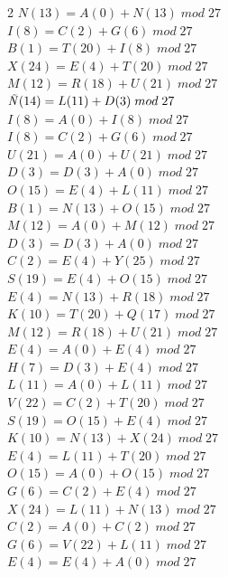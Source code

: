 \documentclass{article}
\begin{document}
\begin{enumerate}
\begin{multicols}{2}
$N (13) = A (0) + N (13) \; mod \; 27$ \\
$I (8) = C (2) + G (6) \; mod \; 27$ \\
$B (1) = T (20) + I (8) \; mod \; 27$ \\
$X (24) = E (4) + T (20) \; mod \; 27$ \\
$M (12) = R (18) + U (21) \; mod \; 27$ \\
$\text{\textit{Ñ}} (14) = L (11) + D (3) \; mod \; 27$ \\
$I (8) = A (0) + I (8) \; mod \; 27$ \\
$I (8) = C (2) + G (6) \; mod \; 27$ \\
$U (21) = A (0) + U (21) \; mod \; 27$ \\
$D (3) = D (3) + A (0) \; mod \; 27$ \\
$O (15) = E (4) + L (11) \; mod \; 27$ \\
$B (1) = N (13) + O (15) \; mod \; 27$ \\
$M (12) = A (0) + M (12) \; mod \; 27$ \\
$D (3) = D (3) + A (0) \; mod \; 27$ \\
$C (2) = E (4) + Y (25) \; mod \; 27$ \\
$S (19) = E (4) + O (15) \; mod \; 27$ \\
$E (4) = N (13) + R (18) \; mod \; 27$ \\
$K (10) = T (20) + Q (17) \; mod \; 27$ \\
$M (12) = R (18) + U (21) \; mod \; 27$ \\
$E (4) = A (0) + E (4) \; mod \; 27$ \\
$H (7) = D (3) + E (4) \; mod \; 27$ \\
$L (11) = A (0) + L (11) \; mod \; 27$ \\
$V (22) = C (2) + T (20) \; mod \; 27$ \\
$S (19) = O (15) + E (4) \; mod \; 27$ \\
$K (10) = N (13) + X (24) \; mod \; 27$ \\
$E (4) = L (11) + T (20) \; mod \; 27$ \\
$O (15) = A (0) + O (15) \; mod \; 27$ \\
$G (6) = C (2) + E (4) \; mod \; 27$ \\
$X (24) = L (11) + N (13) \; mod \; 27$ \\
$C (2) = A (0) + C (2) \; mod \; 27$ \\
$G (6) = V (22) + L (11) \; mod \; 27$ \\
$E (4) = E (4) + A (0) \; mod \; 27$ \\
\end{multicols}



\end{enumerate}
\end{document}
